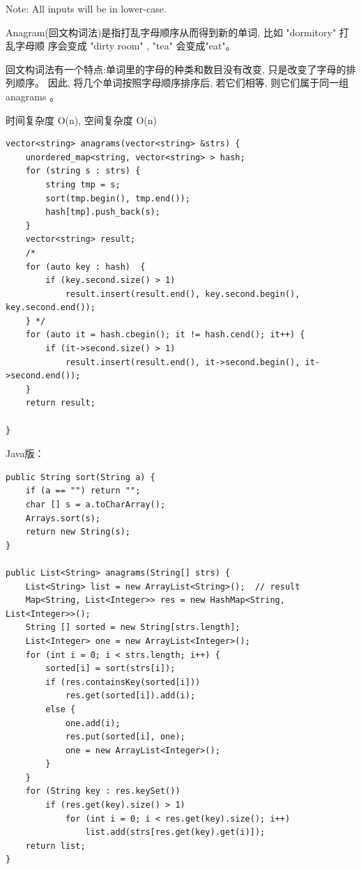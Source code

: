 \documentclass[12pt]{book}
\begin{document}
Note: All inputs will be in lower-case.

Anagram(回文构词法)是指打乱字母顺序从而得到新的单词, 比如 "dormitory" 打乱字母顺
序会变成 "dirty room" , "tea" 会变成"eat"。

回文构词法有一个特点:单词里的字母的种类和数目没有改变, 只是改变了字母的排列顺序。
因此, 将几个单词按照字母顺序排序后, 若它们相等, 则它们属于同一组 anagrams 。

时间复杂度 O(n), 空间复杂度 O(n)

\lstset{language=java,label= ,caption= ,numbers=none}
\begin{lstlisting}
vector<string> anagrams(vector<string> &strs) {
    unordered_map<string, vector<string> > hash;
    for (string s : strs) {
        string tmp = s;
        sort(tmp.begin(), tmp.end());
        hash[tmp].push_back(s);
    }
    vector<string> result;
    /*
    for (auto key : hash)  {
        if (key.second.size() > 1)
            result.insert(result.end(), key.second.begin(), key.second.end());
    } */
    for (auto it = hash.cbegin(); it != hash.cend(); it++) {
        if (it->second.size() > 1)
            result.insert(result.end(), it->second.begin(), it->second.end());
    }
    return result;

}
\end{lstlisting}

Java版：

\lstset{language=java,label= ,caption= ,numbers=none}
\begin{lstlisting}
public String sort(String a) {
    if (a == "") return "";
    char [] s = a.toCharArray();
    Arrays.sort(s);
    return new String(s);
}
        
public List<String> anagrams(String[] strs) {
    List<String> list = new ArrayList<String>();  // result
    Map<String, List<Integer>> res = new HashMap<String, List<Integer>>();
    String [] sorted = new String[strs.length];
    List<Integer> one = new ArrayList<Integer>();
    for (int i = 0; i < strs.length; i++) {
        sorted[i] = sort(strs[i]);
        if (res.containsKey(sorted[i])) 
            res.get(sorted[i]).add(i);
        else {
            one.add(i);
            res.put(sorted[i], one);
            one = new ArrayList<Integer>();
        }
    }
    for (String key : res.keySet()) 
        if (res.get(key).size() > 1) 
            for (int i = 0; i < res.get(key).size(); i++) 
                list.add(strs[res.get(key).get(i)]);
    return list;
}
\end{lstlisting}
\end{document}
